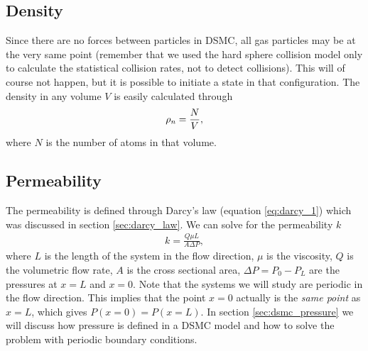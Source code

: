 \subsection{Density}
Since there are no forces between particles in DSMC, all gas particles may be at the very same point (remember that we used the hard sphere collision model only to calculate the statistical collision rates, not to detect collisions). This will of course not happen, but it is possible to initiate a state in that configuration. The density in any volume $V$ is easily calculated through
\begin{align}
	\rho_n = {N \over V},
\end{align}
where $N$ is the number of atoms in that volume. 

\subsection{Permeability}
\label{sec:permeability_dsmc}
The permeability is defined through Darcy's law (equation \eqref{eq:darcy_1}) which was discussed in section \ref{sec:darcy_law}. We can solve for the permeability $k$
\begin{align}
	\label{eq:permeability_gas}
	k = \frac{Q \mu L}{A\Delta P},
\end{align}
where $L$ is the length of the system in the flow direction, $\mu$ is the viscosity, $Q$ is the volumetric flow rate, $A$ is the cross sectional area, $\Delta P = P_0 - P_L$ are the pressures at $x=L$ and $x=0$. Note that the systems we will study are periodic in the flow direction. This implies that the point $x=0$ actually is the \textit{same point} as $x=L$, which gives $P(x=0) = P(x=L)$. In section \ref{sec:dsmc_pressure} we will discuss how pressure is defined in a DSMC model and how to solve the problem with periodic boundary conditions.